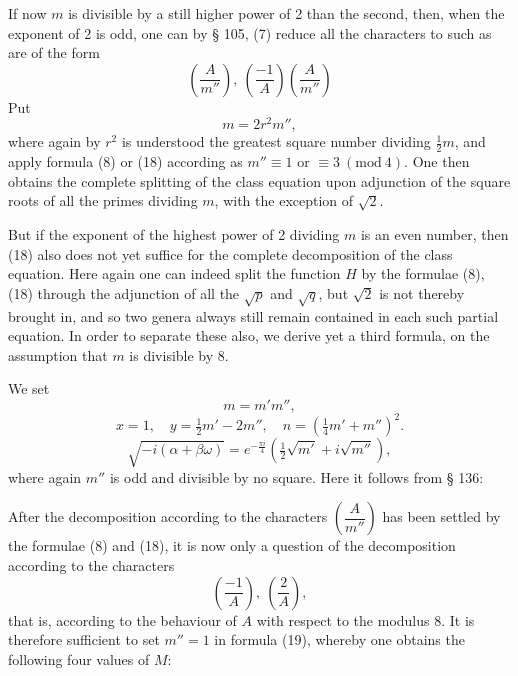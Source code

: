 If now $m$ is divisible by a still higher power of 2 than the second, then, when the exponent of 2 is odd, one can by § 105, (7) reduce all the characters to such as are of the form
\[
\left(\frac{A}{m''}\right), \ \left(\frac{-1}{A}\right)\left(\frac{A}{m''}\right)
\]
Put
\[
m = 2r^2 m'',
\]
where again by $r^2$ is understood the greatest square number dividing $\tfrac12 m$, and apply formula (8) or (18) according as $m'' \equiv 1$ or $\equiv 3\ (\mathrm{mod}\ 4)$. One then obtains the complete splitting of the class equation upon adjunction of the square roots of all the primes dividing $m$, with the exception of $\sqrt2$.

But if the exponent of the highest power of 2 dividing $m$ is an even number, then (18) also does not yet suffice for the complete decomposition of the class equation. Here again one can indeed split the function $H$ by the formulae (8), (18) through the adjunction of all the $\sqrt p$ and $\sqrt q$, but $\sqrt2$ is not thereby brought in, and so two genera always still remain contained in each such partial equation. In order to separate these also, we derive yet a third formula, on the assumption that $m$ is divisible by 8.

We set
\[
m = m'm'',
\]
\[
x = 1, \quad y = \tfrac12 m' - 2m'', \quad n = \left(\tfrac14 m' + m''\right)^2.
\]
\[
\sqrt{-i(\alpha+\beta\omega)} = e^{-\frac{\pi i}{4}}\left(\tfrac12\sqrt{m'} + i\sqrt{m''}\right),
\]
where again $m''$ is odd and divisible by no square. Here it follows from § 136:

After the decomposition according to the characters $\left(\dfrac{A}{m''}\right)$ has been settled by the formulae (8) and (18), it is now only a question of the decomposition according to the characters
\[
\left(\frac{-1}{A}\right), \ \left(\frac{2}{A}\right),
\]
that is, according to the behaviour of $A$ with respect to the modulus 8. It is therefore sufficient to set $m'' = 1$ in formula (19), whereby one obtains the following four values of $M$:
